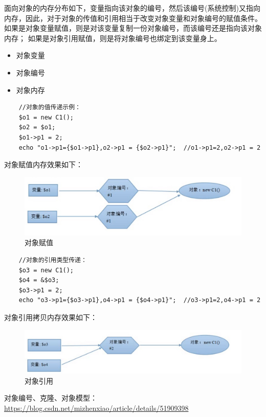 \documentclass[UTF8,a4paper,12pt]{ctexbook}
\begin{document}
		
		面向对象的内存分布如下，变量指向该对象的编号，然后该编号(系统控制)又指向内存，因此，对于对象的传值和引用相当于改变对象变量和对象编号的赋值条件。如果是对象变量赋值，则是对该变量复制一份对象编号，而该编号还是指向该对象内存； 如果是对象引用赋值，则是将对象编号也绑定到该变量身上。
			\begin{itemize}[itemindent = 1em]
				\item 对象变量
				\item 对象编号
				\item 对象内存
			\end{itemize}
			
			\begin{lstlisting}
	//对象的值传递示例：
	$o1 = new C1();
	$o2 = $o1;
	$o1->p1 = 2;
	echo "o1->p1={$o1->p1},o2->p1 = {$o2->p1}";  //o1->p1=2,o2->p1 = 2		
			\end{lstlisting}
			对象赋值内存效果如下：
			
			\begin{figure}[H]
				\centering
				\includegraphics[scale=0.5]{fuzhi}
				\caption{对象赋值}
			\end{figure}
			
			\begin{lstlisting}
	//对象的引用类型传递：
	$o3 = new C1();
	$o4 = &$o3;
	$o3->p1 = 2;
	echo "o3->p1={$o3->p1},o4->p1 = {$o4->p1}";  //o3->p1=2,o4->p1 = 2
			\end{lstlisting}
			对象引用拷贝内存效果如下：
			
			\begin{figure}[H]
				\centering
				\includegraphics[scale=0.47]{yinyong}
				\caption{对象引用}
			\end{figure}
			
			
		对象编号、克隆、对象模型：\url{https://blog.csdn.net/mizhenxiao/article/details/51909398}
	
\end{document}
